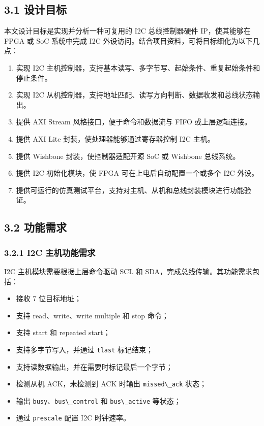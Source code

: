 \subsection{3.1 设计目标}\label{ux8bbeux8ba1ux76eeux6807}

本文设计目标是实现并分析一种可复用的 I2C 总线控制器硬件 IP，使其能够在
FPGA 或 SoC 系统中完成 I2C
外设访问。结合项目资料，可将目标细化为以下几点：

\begin{enumerate}
\def\labelenumi{\arabic{enumi}.}
\tightlist
\item
  实现 I2C
  主机控制器，支持基本读写、多字节写、起始条件、重复起始条件和停止条件。
\item
  实现 I2C
  从机控制器，支持地址匹配、读写方向判断、数据收发和总线状态输出。
\item
  提供 AXI Stream 风格接口，便于命令和数据流与 FIFO 或上层逻辑连接。
\item
  提供 AXI Lite 封装，使处理器能够通过寄存器控制 I2C 主机。
\item
  提供 Wishbone 封装，使控制器适配开源 SoC 或 Wishbone 总线系统。
\item
  提供 I2C 初始化模块，使 FPGA 可在上电后自动配置一个或多个 I2C 外设。
\item
  提供可运行的仿真测试平台，支持对主机、从机和总线封装模块进行功能验证。
\end{enumerate}

\subsection{3.2 功能需求}\label{ux529fux80fdux9700ux6c42}

\subsubsection{3.2.1 I2C
主机功能需求}\label{i2c-ux4e3bux673aux529fux80fdux9700ux6c42}

I2C 主机模块需要根据上层命令驱动 SCL 和
SDA，完成总线传输。其功能需求包括：

\begin{itemize}
\tightlist
\item
  接收 7 位目标地址；
\item
  支持 read、write、write multiple 和 stop 命令；
\item
  支持 start 和 repeated start；
\item
  支持多字节写入，并通过 \passthrough{\lstinline!tlast!} 标记结束；
\item
  支持读数据输出，并在需要时标记最后一个字节；
\item
  检测从机 ACK，未检测到 ACK 时输出
  \passthrough{\lstinline!missed\_ack!} 状态；
\item
  输出
  \passthrough{\lstinline!busy!}、\passthrough{\lstinline!bus\_control!}
  和 \passthrough{\lstinline!bus\_active!} 等状态；
\item
  通过 \passthrough{\lstinline!prescale!} 配置 I2C 时钟速率。
\end{itemize}

